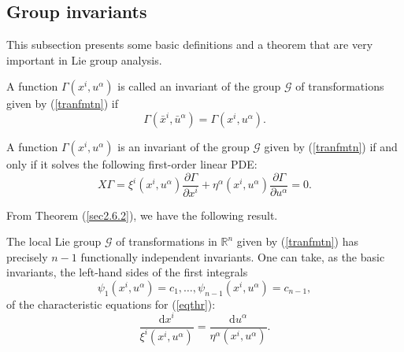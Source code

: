 \subsection{ Group invariants}
This subsection  presents some basic definitions and a  theorem that are very important in Lie group analysis.
\begin{defn} A function $ \Gamma(x^i,u^{\alpha}) $ is called an invariant of  the group $\mathcal{G}$ of transformations given by (\ref{tranfmtn}) if 
	\begin{equation}
	\Gamma( \bar{x}^i,\bar{u}^{\alpha}) = \Gamma(x^i,u^{\alpha}). \label{sec2.6.1}
	\end{equation}  \end{defn}
\begin{thm} A function $\Gamma(x^i,u^{\alpha})$ is  an invariant of the group $\mathcal{G}$  given by (\ref{tranfmtn}) if and only if it solves the following first-order linear PDE: \citep{ibragimov} \begin{equation} X \Gamma = \xi^i(x^i,u^{\alpha}) \frac{ \partial \Gamma  }{ \partial x^i} + \eta^{\alpha}(x^i,u^{\alpha})  \frac{ \partial \Gamma }{ \partial u^{\alpha }} =0.\label{eqthr}
	\end{equation} \label{sec2.6.2}
\end{thm}
From Theorem (\ref{sec2.6.2}), we have the following result.
\begin{thm}
 The local Lie  group $\mathcal{G}$ of transformations in  $\mathbb{R}^n$ given by  (\ref{tranfmtn}) \citep{ibragimov2009practical} has  precisely $ n-1$ functionally independent invariants. One can take, as the basic invariants, the left-hand sides of the first integrals  \begin{equation}
	\psi_1(x^i,u^{\alpha})=c_1, \ldots,\psi_{n-1}(x^i,u^{\alpha}) = c_{n-1}, \label{sec2.6.3}
	\end{equation} of the characteristic equations for (\ref{eqthr}):
	\begin{equation}\frac{ \mathrm{d}x^i}{ \xi^i(x^i,u^{\alpha})}= \frac{ \mathrm{d}u^{\alpha}}{ \eta^{\alpha}(x^i,u^{\alpha})}. \label{sec2.6.4}
	\end{equation} \label{thm17}	
\end{thm}
